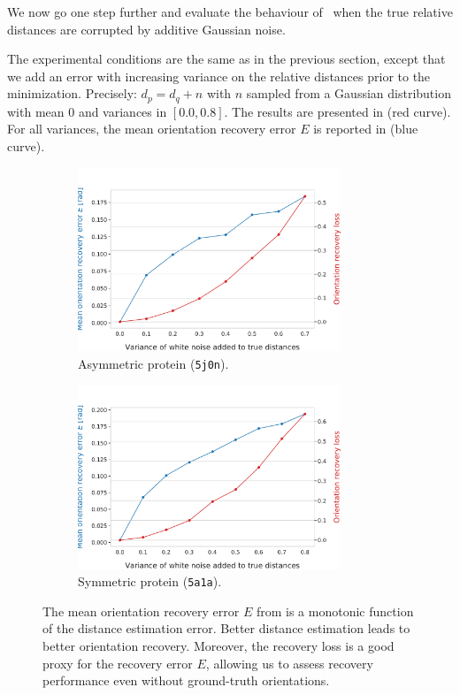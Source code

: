 We now go one step further and evaluate the behaviour of~ when the true relative distances are corrupted by additive Gaussian noise.

The experimental conditions are the same as in the previous section, except that we add an error with increasing variance on the relative distances prior to the minimization. Precisely: $d_p = d_q + n$ with $n$ sampled from a Gaussian distribution with mean 0 and variances in $[0.0, 0.8]$.
The results are presented in  (red curve).
For all variances, the mean orientation recovery error $E$ is reported in  (blue curve).

\begin{figure}[ht!]
    \centering
    \begin{subfigure}[b]{0.48\textwidth}
        \includegraphics[height=5.5cm]{figures/5j0n_perfect_noisy_ar_aa}
        \caption{Asymmetric protein (\texttt{5j0n}).}
    \end{subfigure}
    \hfill
    \begin{subfigure}[b]{0.50\textwidth}
    \centering
        \includegraphics[height=5.5cm]{figures/5a1a_perfect_noisy_ar_aa}
        \caption{Symmetric protein (\texttt{5a1a}).}
    \end{subfigure}
    \caption{
        The mean orientation recovery error $E$ from  is a monotonic function of the distance estimation error.
        Better distance estimation leads to better orientation recovery.
        Moreover, the recovery loss  is a good proxy for the recovery error $E$, allowing us to assess recovery performance even without ground-truth orientations.
}
    \label{fig:perfect-with-noise-ar-aa}
\end{figure}

